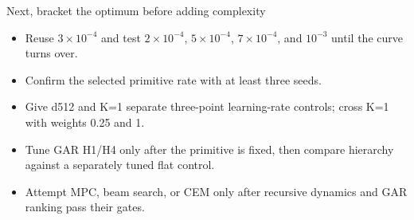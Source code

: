 \documentclass[aspectratio=169]{beamer}
\begin{document}
\begin{frame}{Next, bracket the optimum before adding complexity}
  \begin{itemize}
    \item Reuse $3\times10^{-4}$ and test $2\times10^{-4}$, $5\times10^{-4}$, $7\times10^{-4}$, and $10^{-3}$ until the curve turns over.
    \item Confirm the selected primitive rate with at least three seeds.
    \item Give d512 and K=1 separate three-point learning-rate controls; cross K=1 with weights 0.25 and 1.
    \item Tune GAR H1/H4 only after the primitive is fixed, then compare hierarchy against a separately tuned flat control.
    \item Attempt MPC, beam search, or CEM only after recursive dynamics and GAR ranking pass their gates.
  \end{itemize}
\end{frame}
\end{document}
